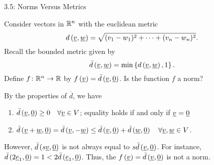 \documentclass[10pt,english,aspectratio=169]{beamer}
\begin{document}
\begin{frame}{3.5: Norms Versus Metrics}

\begin{example}
Consider vectors in $\mathbb{R}^n$ with the euclidean metric
\begin{equation*}
d \left( \underline{v}, \underline{w} \right)
= \sqrt{ (v_1 - w_1)^2 + \cdots + (v_n - w_n)^2 }.
\end{equation*}
Recall the bounded metric given by
\begin{equation*}
\bar{d} \left( \underline{v}, \underline{w} \right)
= \min \left\{ d \left( \underline{v}, \underline{w} \right), 1 \right\}.
\end{equation*}
\vspace{3mm}
Define $f \colon \mathbb{R}^n \rightarrow \mathbb{R}$ by
$f \left( \underline{v} \right) = \bar{d} \left( \underline{v}, \underline{0} \right)$.
Is the function $f$ a norm?

By the properties of $\overline{d}$, we have
\begin{enumerate}
\item $\bar{d} \left( \underline{v}, \underline{0} \right) \geq 0 \quad \forall \underline{v} \in V$; equality holds if and only if $\underline{v} = \underline{0}$
\item $\bar{d} \left( \underline{v} + \underline{w}, \underline{0}\right) = \bar{d} \left( \underline{v}, -\underline{w} \right) \leq \bar{d} \left( \underline{v}, \underline{0} \right) + \bar{d} \left( \underline{w}, \underline{0} \right) \quad \forall \underline{v}, \underline{w} \in V$.
\end{enumerate}

\vspace{2mm}

However, $\bar{d} \left( s \underline{v}, \underline{0} \right)$ is not always equal to $s \bar{d} \left( \underline{v}, \underline{0} \right)$.
For instance,
$\bar{d} \left( 2 \underline{e}_1, \underline{0} \right) = 1 < 2 \bar{d} \left( \underline{e}_1, \underline{0} \right)$.
Thus, the $f \left( \underline{v} \right) = \bar{d} \left( \underline{v}, \underline{0} \right)$
is not a norm.
\end{example}

\end{frame}
\end{document}
